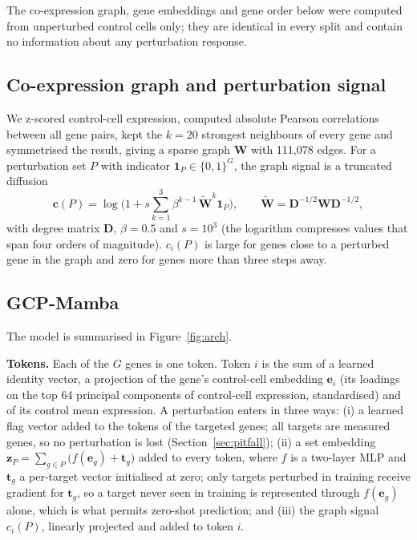 \documentclass{bioinfo}
\begin{document}
The co-expression graph, gene embeddings and gene order below were computed from unperturbed
control cells only; they are identical in every split and contain no information about any
perturbation response.

\subsection{Co-expression graph and perturbation signal}
We z-scored control-cell expression, computed absolute Pearson correlations between all gene
pairs, kept the $k=20$ strongest neighbours of every gene and symmetrised the result, giving a
sparse graph $\mathbf{W}$ with 111{,}078 edges. For a perturbation set $P$ with indicator
$\mathbf{1}_P\in\{0,1\}^G$, the graph signal is a truncated diffusion
\begin{equation}
\mathbf{c}(P)=\log\!\Big(1+s\sum_{k=1}^{3}\beta^{k-1}\,\widetilde{\mathbf{W}}^{k}\mathbf{1}_P\Big),
\qquad \widetilde{\mathbf{W}}=\mathbf{D}^{-1/2}\mathbf{W}\mathbf{D}^{-1/2},
\end{equation}
with degree matrix $\mathbf{D}$, $\beta=0.5$ and $s=10^{3}$ (the logarithm compresses values that
span four orders of magnitude). $c_i(P)$ is large for genes close to a perturbed gene in the graph
and zero for genes more than three steps away.

\subsection{GCP-Mamba}
\label{sec:model}
The model is summarised in Figure~\ref{fig:arch}.

\textbf{Tokens.} Each of the $G$ genes is one token. Token $i$ is the sum of a learned identity
vector, a projection of the gene's control-cell embedding $\mathbf{e}_i$ (its loadings on the top
64 principal components of control-cell expression, standardised) and of its control mean
expression. A perturbation enters in three ways: (i) a learned flag vector added to the tokens of the
targeted genes; all targets are measured genes, so no perturbation is lost (Section~\ref{sec:pitfall});
(ii) a set embedding $\mathbf{z}_P=\sum_{g\in P}\big(f(\mathbf{e}_g)+\mathbf{t}_g\big)$ added to every
token, where $f$ is a two-layer MLP and $\mathbf{t}_g$ a per-target vector initialised at zero; only
targets perturbed in training receive gradient for $\mathbf{t}_g$, so a target never seen in
training is represented through $f(\mathbf{e}_g)$ alone, which is what permits zero-shot prediction;
and (iii) the graph signal $c_i(P)$, linearly projected and added to token $i$.
\end{document}
